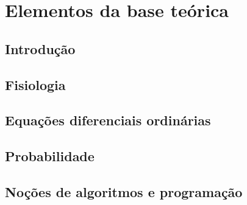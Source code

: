 \chapter{Elementos da base teórica}\label{cap:teoria}
\section{Introdução}\label{sec:teoria_intro}

\section{Fisiologia}\label{sec:fisiologia}

\section{Equações diferenciais ordinárias}\label{sec:eqdif}

\section{Probabilidade}\label{sec:probabilidade}

\section{Noções de algoritmos e programação}\label{sec:algoritmo}
